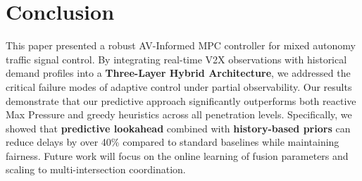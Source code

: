 \documentclass[conference]{IEEEtran}
\begin{document}
\section{Conclusion}
\label{sec:conclusion}
This paper presented a robust AV-Informed MPC controller for mixed autonomy traffic signal control. By integrating real-time V2X observations with historical demand profiles into a \textbf{Three-Layer Hybrid Architecture}, we addressed the critical failure modes of adaptive control under partial observability. Our results demonstrate that our predictive approach significantly outperforms both reactive Max Pressure and greedy heuristics across all penetration levels. Specifically, we showed that \textbf{predictive lookahead} combined with \textbf{history-based priors} can reduce delays by over 40\% compared to standard baselines while maintaining fairness. Future work will focus on the online learning of fusion parameters and scaling to multi-intersection coordination.



\end{document}
